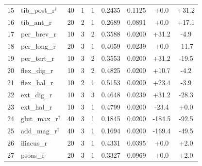 \begin{table}[htbp]
\begin{tabular}{rlccccccc}
15 & tib\_post\_r$^{\dagger}$ & 40 & 1 & 1 & 0.2435 & 0.1125 & +0.0 & +31.2 \\
16 & tib\_ant\_r & 20 & 2 & 1 & 0.2689 & 0.0891 & +0.0 & +17.1 \\
17 & per\_brev\_r & 10 & 3 & 2 & 0.3588 & 0.0200 & +31.2 & -4.9 \\
18 & per\_long\_r & 20 & 3 & 1 & 0.4059 & 0.0239 & +0.0 & -11.7 \\
19 & per\_tert\_r & 10 & 3 & 2 & 0.3553 & 0.0200 & +31.2 & -19.5 \\
20 & flex\_dig\_r & 10 & 3 & 2 & 0.4825 & 0.0200 & +10.7 & -4.2 \\
21 & flex\_hal\_r & 10 & 2 & 1 & 0.5153 & 0.0200 & +23.4 & -3.9 \\
22 & ext\_dig\_r & 10 & 3 & 3 & 0.4648 & 0.0239 & +31.2 & -28.3 \\
23 & ext\_hal\_r & 10 & 3 & 1 & 0.4799 & 0.0200 & -23.4 & +0.0 \\
24 & glut\_max\_r$^{\dagger}$ & 40 & 3 & 1 & 0.1845 & 0.0200 & -184.5 & -92.5 \\
25 & add\_mag\_r$^{\dagger}$ & 40 & 3 & 1 & 0.1694 & 0.0200 & -169.4 & -49.5 \\
26 & iliacus\_r & 20 & 3 & 1 & 0.4331 & 0.0395 & +0.0 & +2.0 \\
27 & psoas\_r & 20 & 3 & 1 & 0.3327 & 0.0969 & +0.0 & +2.0 \\
\bottomrule
\end{tabular}
\end{table}
